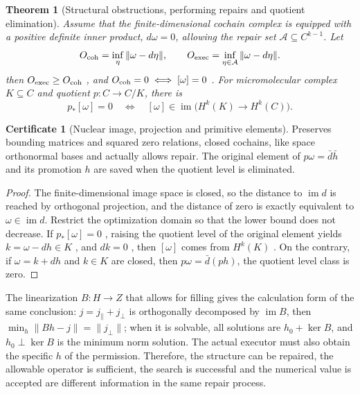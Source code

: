 \documentclass[11pt,a4paper]{article}
\theoremstyle{plain}
\newtheorem{theorem}{Theorem}[section]
\theoremstyle{definition}
\newtheorem*{certificate}{Certificate}
\theoremstyle{remark}
\begin{document}
\begin{CJK*}
\begin{theorem}
[Structural obstructions, performing repairs and quotient elimination]\label{pc:obstruction}
Assume that the finite-dimensional cochain complex is equipped with a positive definite inner product, $d\omega=0$, allowing the repair set $\mathcal A\subseteq C^{k-1}$. Let \[
 O_{\rm coh}=\inf_\eta\|\omega-d\eta\|,
 \qquad O_{\rm exec}=\inf_{\eta\in\mathcal A}\|\omega-d\eta\|.
\] then $O_{\rm exec}\ge O_{\rm coh}$ , and $O_{\rm coh}=0\iff[\omega]=0$ . For micromolecular complex $K\subseteq C$ and quotient $p:C\to C/K$, there is \begin{equation}
\label{pc:eq-obstruction-kernel}
 p_*[\omega]=0\quad\Longleftrightarrow\quad
 [\omega]\in\operatorname{im}\bigl(H^k(K)\to H^k(C)\bigr).
\end{equation}\end{theorem}
\begin{certificate}
[Nuclear image, projection and primitive elements]Preserves bounding matrices and squared zero relations, closed cochains, like space orthonormal bases and actually allows repair. The original element of $p\omega=\bar d\bar h$ and its promotion $h$ are saved when the quotient level is eliminated.\end{certificate}
\begin{proof}
The finite-dimensional image space is closed, so the distance to $\operatorname{im}d$ is reached by orthogonal projection, and the distance of zero is exactly equivalent to $\omega\in\operatorname{im}d$. Restrict the optimization domain so that the lower bound does not decrease. If $p_*[\omega]=0$ , raising the quotient level of the original element yields $k=\omega-dh\in K$ , and $dk=0$ , then $[\omega]$ comes from $H^k(K)$ . On the contrary, if $\omega=k+dh$ and $k\in K$ are closed, then $p\omega=\bar d(ph)$, the quotient level class is zero.\end{proof}


The linearization $B:H\to Z$ that allows for filling gives the calculation form of the same conclusion: $j=j_{\parallel}+j_{\perp}$ is orthogonally decomposed by $\operatorname{im}B$, then $\min_h\|Bh-j\|=\|j_{\perp}\|$; when it is solvable, all solutions are $h_0+\ker B$, and $h_0\perp\ker B$ is the minimum norm solution. The actual executor must also obtain the specific $h$ of the permission. Therefore, the structure can be repaired, the allowable operator is sufficient, the search is successful and the numerical value is accepted are different information in the same repair process.


\end{CJK*}
\end{document}
